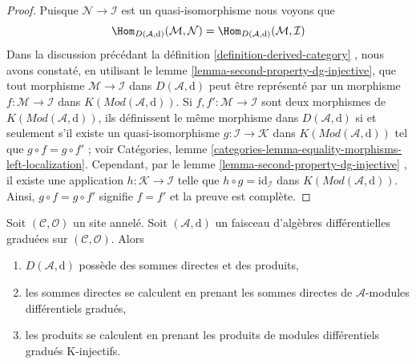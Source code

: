 \begin{proof}
Puisque $\mathcal{N} \to \mathcal{I}$ est un quasi-isomorphisme nous voyons que
$$
\Hom_{D(\mathcal{A}, \text{d})}(\mathcal{M}, \mathcal{N}) =
\Hom_{D(\mathcal{A}, \text{d})}(\mathcal{M}, \mathcal{I})
$$
Dans la discussion précédant la définition \ref{definition-derived-category} , nous avons constaté, en utilisant le lemme \ref{lemma-second-property-dg-injective}, que tout morphisme $\mathcal{M} \to \mathcal{I}$ dans $D(\mathcal{A}, \text{d})$ peut être représenté par un morphisme $f : \mathcal{M} \to \mathcal{I}$ dans $K(\textit{Mod}(\mathcal{A}, \text{d}))$.
Si $f, f' :  \mathcal{M} \to \mathcal{I}$ sont deux morphismes de $K(\textit{Mod}(\mathcal{A}, \text{d}))$, ils définissent le même morphisme dans $D(\mathcal{A}, \text{d})$ si et seulement s'il existe un quasi-isomorphisme $g : \mathcal{I} \to \mathcal{K}$ dans $K(\textit{Mod}(\mathcal{A}, \text{d}))$ tel que $g \circ f = g \circ f'$ ; voir Catégories, lemme \ref{categories-lemma-equality-morphisms-left-localization}.
Cependant, par le lemme \ref{lemma-second-property-dg-injective} , il existe une application $h : \mathcal{K} \to \mathcal{I}$ telle que $h \circ g = \text{id}_\mathcal{I}$ dans $K(\textit{Mod}(\mathcal{A}, \text{d}))$.
Ainsi, $g \circ f = g \circ f'$ signifie $f = f'$ et la preuve est complète.
\end{proof}

\begin{lemma}
\label{lemma-derived-products}
Soit $(\mathcal{C}, \mathcal{O})$ un site annelé.
Soit $(\mathcal{A}, \text{d})$ un faisceau d'algèbres différentielles graduées sur $(\mathcal{C}, \mathcal{O})$.
Alors
\begin{enumerate}
\item $D(\mathcal{A}, \text{d})$ possède des sommes directes et des produits, \item les sommes directes se calculent en prenant les sommes directes de $\mathcal{A}$-modules différentiels gradués, \item les produits se calculent en prenant les produits de modules différentiels gradués K-injectifs.
\end{enumerate}
\end{lemma}

